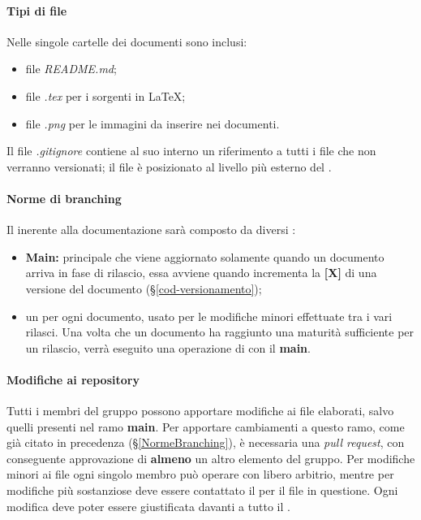 {{\paragraph*{Tipi di file}
Nelle singole cartelle dei documenti sono inclusi:
\begin{itemize}
\item file \textit{README.md};
\item file \textit{.tex} per i sorgenti in \LaTeX; 
\item file \textit{.png} per le immagini da inserire nei documenti.
\end{itemize}
Il file \textit{.gitignore} contiene al suo interno un riferimento a tutti i file che non verranno versionati; il file è posizionato al livello più esterno del .
\paragraph*{Norme di branching}
\label{NormeBranching}
Il  inerente alla documentazione sarà composto da diversi :
\begin{itemize}
	\item \textbf{Main:}  principale che viene aggiornato solamente quando un documento arriva in fase di rilascio, essa avviene quando incrementa la \textbf{[X]} di una versione del documento (\S{}\ref{cod-versionamento});
	\item un  per ogni documento, usato per le modifiche minori effettuate tra i vari rilasci. Una volta che un documento ha raggiunto una maturità sufficiente per un rilascio, verrà eseguito una operazione di  con il \textbf{main}.
\end{itemize}
\paragraph*{Modifiche ai repository}
Tutti i membri del gruppo possono apportare modifiche ai file elaborati, salvo quelli presenti nel ramo \textbf{main}. Per apportare cambiamenti a questo ramo, come già citato in precedenza (\S{}\ref{NormeBranching}), è necessaria una \textit{pull request}, con conseguente approvazione di \textbf{almeno} un altro elemento del gruppo.\newline
Per modifiche minori ai file ogni singolo membro può operare con libero arbitrio, mentre per modifiche più sostanziose deve essere contattato il \RdP{} per il file in questione.\newline
Ogni modifica deve poter essere giustificata davanti a tutto il .
\newpage
}}
